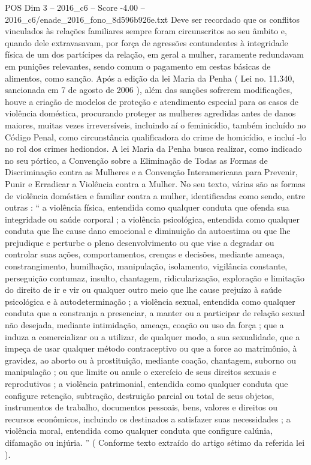 \begin{textsample}{POS Dim 3 – 2016\_c6 – Score -4.00 – 2016\_c6/enade\_2016\_fono\_8d596b926e.txt}
Deve ser recordado que os conflitos vinculados às relações familiares sempre foram circunscritos ao seu âmbito e, quando dele extravasavam, por força de agressões contundentes à integridade física de um dos partícipes da relação, em geral a mulher, raramente redundavam em punições relevantes, sendo comum o pagamento em cestas básicas de alimentos, como sanção.
Após a edição da lei Maria da Penha ( Lei no. 11.340, sancionada em 7 de agosto de 2006 ), além das sanções sofrerem modificações, houve a criação de modelos de proteção e atendimento especial para os casos de violência doméstica, procurando proteger as mulheres agredidas antes de danos maiores, muitas vezes irreversíveis, incluindo aí o feminicídio, também incluído no Código Penal, como circunstância qualificadora do crime de homicídio, e incluí -lo no rol dos crimes hediondos.
A lei Maria da Penha busca realizar, como indicado no seu pórtico, a Convenção sobre a Eliminação de Todas as Formas de Discriminação contra as Mulheres e a Convenção Interamericana para Prevenir, Punir e Erradicar a Violência contra a Mulher.
No seu texto, várias são as formas de violência doméstica e familiar contra a mulher, identificadas como sendo, entre outras : “ a violência física, entendida como qualquer conduta que ofenda sua integridade ou saúde corporal ; a violência psicológica, entendida como qualquer conduta que lhe cause dano emocional e diminuição da autoestima ou que lhe prejudique e perturbe o pleno desenvolvimento ou que vise a degradar ou controlar suas ações, comportamentos, crenças e decisões, mediante ameaça, constrangimento, humilhação, manipulação, isolamento, vigilância constante, perseguição contumaz, insulto, chantagem, ridicularização, exploração e limitação do direito de ir e vir ou qualquer outro meio que lhe cause prejuízo à saúde psicológica e à autodeterminação ; a violência sexual, entendida como qualquer conduta que a constranja a presenciar, a manter ou a participar de relação sexual não desejada, mediante intimidação, ameaça, coação ou uso da força ; que a induza a comercializar ou a utilizar, de qualquer modo, a sua sexualidade, que a impeça de usar qualquer método contraceptivo ou que a force ao matrimônio, à gravidez, ao aborto ou à prostituição, mediante coação, chantagem, suborno ou manipulação ; ou que limite ou anule o exercício de seus direitos sexuais e reprodutivos ; a violência patrimonial, entendida como qualquer conduta que configure retenção, subtração, destruição parcial ou total de seus objetos, instrumentos de trabalho, documentos pessoais, bens, valores e direitos ou recursos econômicos, incluindo os destinados a satisfazer suas necessidades ; a violência moral, entendida como qualquer conduta que configure calúnia, difamação ou injúria. ” ( Conforme texto extraído do artigo sétimo da referida lei ).

\end{textsample}
